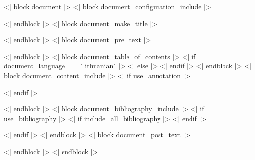 \documentclass[<< document_class_args >>]{<< document_class >>}
\begin{document}
<| block document |>
<| block document_configuration_include |>
  
<| endblock |>
<| block document_make_title |>
  \maketitle
<| endblock |>
<| block document_pre_text |>
  
<| endblock |>
<| block document_table_of_contents |>
  <| if document_language == "lithuanian" |>
  <| else |>
  <| endif |>
  {
    \singlespacing
    \tableofcontents
  }
<| endblock |>
<| block document_content_include |>
  \pagestyle{plain}
  <| if use_annotation |>
  
  <| endif |>
  
<| endblock |>
<| block document_bibliography_include |>
  <| if use_bibliography |>
  <| if include_all_bibliography |>
  \nocite{*}
  <| endif |>

  \Bibliography
  <| endif |>
<| endblock |>
<| block document_post_text |>
  
<| endblock |>
<| endblock |>
\end{document}
